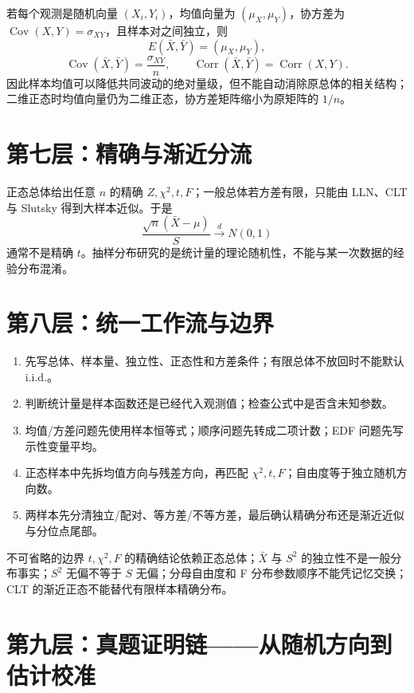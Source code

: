 \documentclass[11pt,a4paper]{ctexart}
\begin{document}
若每个观测是随机向量 $(X_i,Y_i)$，均值向量为 $(\mu_X,\mu_Y)$，协方差为 $\operatorname{Cov}(X,Y)=\sigma_{XY}$，且样本对之间独立，则
\[
E(\bar X,\bar Y)=(\mu_X,\mu_Y),
\]
\[
\operatorname{Cov}(\bar X,\bar Y)=\frac{\sigma_{XY}}{n},\qquad
\operatorname{Corr}(\bar X,\bar Y)=\operatorname{Corr}(X,Y).
\]
因此样本均值可以降低共同波动的绝对量级，但不能自动消除原总体的相关结构；二维正态时均值向量仍为二维正态，协方差矩阵缩小为原矩阵的 $1/n$。

\section{第七层：精确与渐近分流}

正态总体给出任意 $n$ 的精确 $Z,\chi^2,t,F$；一般总体若方差有限，只能由 LLN、CLT 与 Slutsky 得到大样本近似。于是
\[
\frac{\sqrt n(\bar X-\mu)}{S}\xrightarrow{d}N(0,1)
\]
通常不是精确 $t$。抽样分布研究的是统计量的理论随机性，不能与某一次数据的经验分布混淆。

\section{第八层：统一工作流与边界}

\begin{enumerate}
  \item 先写总体、样本量、独立性、正态性和方差条件；有限总体不放回时不能默认 i.i.d.。
  \item 判断统计量是样本函数还是已经代入观测值；检查公式中是否含未知参数。
  \item 均值/方差问题先使用样本恒等式；顺序问题先转成二项计数；EDF 问题先写示性变量平均。
  \item 正态样本中先拆均值方向与残差方向，再匹配 $\chi^2,t,F$；自由度等于独立随机方向数。
  \item 两样本先分清独立/配对、等方差/不等方差，最后确认精确分布还是渐近近似与分位点尾部。
\end{enumerate}

\begin{warnbox}{不可省略的边界}
$t,\chi^2,F$ 的精确结论依赖正态总体；$\bar X$ 与 $S^2$ 的独立性不是一般分布事实；$S^2$ 无偏不等于 $S$ 无偏；分母自由度和 F 分布参数顺序不能凭记忆交换；CLT 的渐近正态不能替代有限样本精确分布。
\end{warnbox}

\section{第九层：真题证明链——从随机方向到估计校准}
\end{document}
